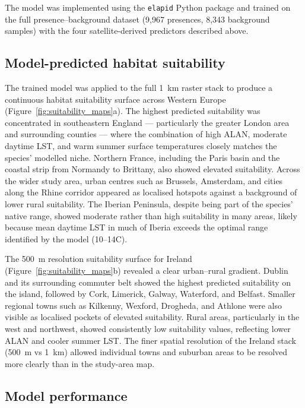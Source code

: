 \documentclass[11pt, a4paper, twocolumn]{article}
\begin{document}
The model was implemented using the \texttt{elapid} Python package and trained on the full presence--background dataset 
 (9,967 presences, 8,343 background samples) with the four satellite-derived predictors described above.

\subsection{Model-predicted habitat suitability}

The trained model was applied to the full 1~km raster stack to produce a continuous habitat suitability surface across Western Europe (Figure~\ref{fig:suitability_maps}a). The highest predicted suitability was concentrated in southeastern England --- particularly the greater London area and surrounding counties --- where the combination of high ALAN, moderate daytime LST, and warm summer surface temperatures closely matches the species' modelled niche. Northern France, including the Paris basin and the coastal strip from Normandy to Brittany, also showed elevated suitability. Across the wider study area, urban centres such as Brussels, Amsterdam, and cities along the Rhine corridor appeared as localised hotspots against a background of lower rural suitability. The Iberian Peninsula, despite being part of the species' native range, showed moderate rather than high suitability in many areas, likely because mean daytime LST in much of Iberia exceeds the optimal range identified by the model (10--14\textdegree C).

The 500~m resolution suitability surface for Ireland (Figure~\ref{fig:suitability_maps}b) revealed a clear urban--rural gradient. Dublin and its surrounding commuter belt showed the highest predicted suitability on the island, followed by Cork, Limerick, Galway, Waterford, and Belfast. Smaller regional towns such as Kilkenny, Wexford, Drogheda, and Athlone were also visible as localised pockets of elevated suitability. Rural areas, particularly in the west and northwest, showed consistently low suitability values, reflecting lower ALAN and cooler summer LST. The finer spatial resolution of the Ireland stack (500~m vs 1~km) allowed individual towns and suburban areas to be resolved more clearly than in the study-area map.

\subsection{Model performance}
\end{document}
